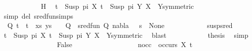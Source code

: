 \begin{isabellebody}
\ \ \ \ \ \ \ \ \ \ \isamarkupfalse%
\ H\ \isamarkupfalse%
\ {\isacartoucheopen}t{}\ {\isacharequal}{\kern0pt}\ Susp\ pi\ X{\isacartoucheclose}\ {\isacartoucheopen}t{}\ {\isacharequal}{\kern0pt}\ Susp\ pi{}\ Y{\isacartoucheclose}\ {\isacartoucheopen}X\ {\isacharequal}{\kern0pt}\ Y{\isacartoucheclose}{\isacharbrackleft}{\kern0pt}symmetric{\isacharbrackright}{\kern0pt}\ \isanewline
\ \ \ \ \ \ \ \ \ \ \isamarkupfalse%
\ {\isacharparenleft}{\kern0pt}simp\ del{\isacharcolon}{\kern0pt}\ sred{\isacharunderscore}{\kern0pt}fun{\isachardot}{\kern0pt}simps{\isacharparenright}{\kern0pt}\isanewline
\ \ \ \ \ \ \ \ \isamarkupfalse%
\ \isamarkupfalse%
\ {\isachardoublequoteopen}{\isasymexists}{\isasymsigma}\ Q{\isachardot}{\kern0pt}\ {\isacharparenleft}{\kern0pt}{\isacharparenleft}{\kern0pt}t{}\ {\isasymapprox}{\isacharquery}{\kern0pt}\ t{}{\isacharparenright}{\kern0pt}\ {\isacharhash}{\kern0pt}\ xs{\isacharcomma}{\kern0pt}\ ys{\isacharparenright}{\kern0pt}\ {\isasymturnstile}\ {\isasymsigma}\ {\isasymleadsto}\ Q\ {\isasymand}\ sred{\isacharunderscore}{\kern0pt}fun\ {\isacharparenleft}{\kern0pt}Q{\isacharcomma}{\kern0pt}\ nabla{\isacharcomma}{\kern0pt}\ {\isasymsigma}\ {\isasymbullet}\ s{\isacharparenright}{\kern0pt}\ {\isacharequal}{\kern0pt}\ None{\isachardoublequoteclose}\isanewline
\ \ \ \ \ \ \ \ \ \ \isamarkupfalse%
\ susp{\isacharunderscore}{\kern0pt}sred\ \isamarkupfalse%
\ {\isacartoucheopen}t{}\ {\isacharequal}{\kern0pt}\ Susp\ pi\ X{\isacartoucheclose}\ {\isacartoucheopen}t{}\ {\isacharequal}{\kern0pt}\ Susp\ pi{}\ Y{\isacartoucheclose}\ {\isacartoucheopen}X\ {\isacharequal}{\kern0pt}\ Y{\isacartoucheclose}{\isacharbrackleft}{\kern0pt}symmetric{\isacharbrackright}{\kern0pt}\ \isamarkupfalse%
\ blast\isanewline
\ \ \ \ \ \ \ \ \isamarkupfalse%
\ \isamarkupfalse%
\ {\isacharquery}{\kern0pt}thesis\ \isamarkupfalse%
\ simp\isanewline
\ \ \ \ \ \ \isamarkupfalse%
\isanewline
\ \ \ \ \ \ \ \ \isamarkupfalse%
\ False\isanewline
\ \ \ \ \ \ \ \ %
\isanewline
\ \ \ \ \ \ \ \ \isamarkupfalse%
\ nocc{\isacharcolon}{\kern0pt}\ {\isachardoublequoteopen}{\isasymnot}\ occurs\ X\ t{}{\isachardoublequoteclose}\isanewline

\end{isabellebody}
